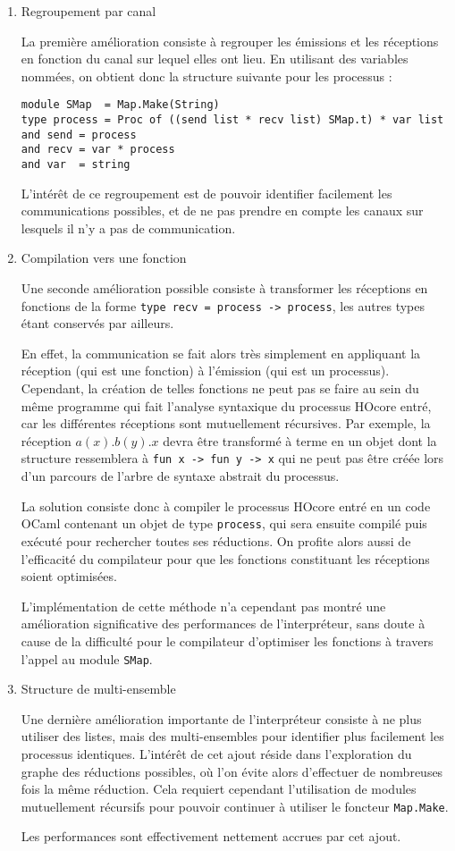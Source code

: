 \documentclass[11pt]{article}
\begin{document}
\begin{enumerate}
\item Regroupement par canal
\label{sec-4-1-1-1}

La première amélioration consiste à regrouper les émissions et les réceptions en fonction du canal sur lequel elles ont lieu.
En utilisant des variables nommées, on obtient donc la structure suivante pour les processus :
\begin{verbatim}
module SMap  = Map.Make(String)
type process = Proc of ((send list * recv list) SMap.t) * var list
and send = process
and recv = var * process
and var  = string
\end{verbatim}

L'intérêt de ce regroupement est de pouvoir identifier facilement les communications possibles, et de ne pas prendre en compte les canaux sur lesquels il n'y a pas de communication.

\item Compilation vers une fonction
\label{sec-4-1-1-2}

Une seconde amélioration possible consiste à transformer les réceptions en fonctions de la forme
\verb|type recv = process -> process|, les autres types étant conservés par ailleurs.

En effet, la communication se fait alors très simplement en appliquant la réception (qui est une fonction) à l'émission (qui est un processus).
Cependant, la création de telles fonctions ne peut pas se faire au sein du même programme qui fait l'analyse syntaxique du processus HOcore entré, car les différentes réceptions sont mutuellement récursives.
Par exemple, la réception $a(x).b(y).x$ devra être transformé à terme en un objet dont la structure ressemblera à
\verb|fun x -> fun y -> x| qui ne peut pas être créée lors d'un parcours de l'arbre de syntaxe abstrait du processus.

La solution consiste donc à compiler le processus HOcore entré en un code OCaml contenant un objet de type \verb|process|, qui sera ensuite compilé puis exécuté pour rechercher toutes ses réductions.
On profite alors aussi de l'efficacité du compilateur pour que les fonctions constituant les réceptions soient optimisées.

L'implémentation de cette méthode n'a cependant pas montré une amélioration significative des performances de l'interpréteur, sans doute à cause de la difficulté pour le compilateur d'optimiser les fonctions à travers l'appel au module \verb|SMap|.

\item Structure de multi-ensemble
\label{sec-4-1-1-3}

Une dernière amélioration importante de l'interpréteur consiste à ne plus utiliser des listes, mais des multi-ensembles pour identifier plus facilement les processus identiques.
L'intérêt de cet ajout réside dans l'exploration du graphe des réductions possibles, où l'on évite alors d'effectuer de nombreuses fois la même réduction.
Cela requiert cependant l'utilisation de modules mutuellement récursifs pour pouvoir continuer à utiliser le foncteur \verb|Map.Make|.

Les performances sont effectivement nettement accrues par cet ajout.

\end{enumerate}
\end{document}
